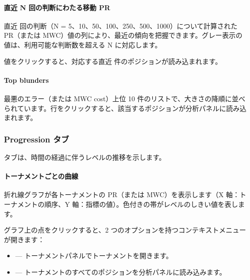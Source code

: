 \documentclass[letterpaper,10pt,dvipdfmx]{sphinxmanual}
\begin{document}
\paragraph{直近 N 回の判断にわたる移動 PR}
\label{\detokenize{manuel:pr-glissant-sur-n-dernieres-decisions}}
\sphinxAtStartPar
直近  回の判断（N = 5、10、50、100、250、500、1000）について計算された PR（または MWC）値の列により、最近の傾向を把握できます。グレー表示の値は、利用可能な判断数を超える N に対応します。

\sphinxAtStartPar
値をクリックすると、対応する直近  件のポジションが読み込まれます。


\paragraph{Top blunders}
\label{\detokenize{manuel:top-blunders}}
\sphinxAtStartPar
最悪のエラー（または MWC cost）上位 10 件のリストで、大きさの降順に並べられています。行をクリックすると、該当するポジションが分析パネルに読み込まれます。


\subsubsection{Progression タブ}
\label{\detokenize{manuel:onglet-progression}}
\sphinxAtStartPar
{} タブは、時間の経過に伴うレベルの推移を示します。


\paragraph{トーナメントごとの曲線}
\label{\detokenize{manuel:courbe-par-tournoi}}
\sphinxAtStartPar
折れ線グラフが各トーナメントの PR（または MWC）を表示します（X 軸：トーナメントの順序、Y 軸：指標の値）。色付きの帯がレベルのしきい値を表します。

\sphinxAtStartPar
グラフ上の点をクリックすると、2 つのオプションを持つコンテキストメニューが開きます：
\begin{itemize}
\item {} 
\sphinxAtStartPar
{} — トーナメントパネルでトーナメントを開きます。

\item {} 
\sphinxAtStartPar
{} — トーナメントのすべてのポジションを分析パネルに読み込みます。

\end{itemize}
\end{document}
